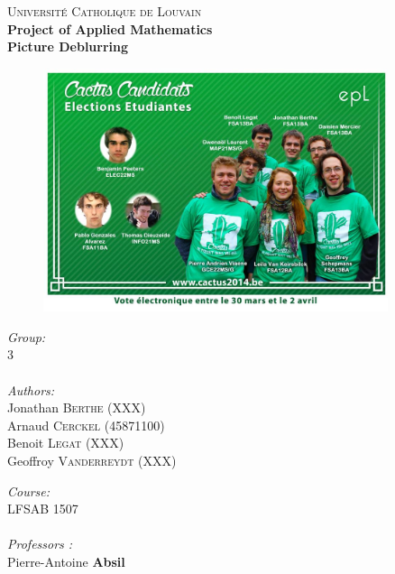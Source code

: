 \begin{titlepage}
\begin{center}
\textsc{\Large Université Catholique de Louvain}\\[0.5cm]
{\Large \bfseries Project of Applied Mathematics}\\
{\huge \bfseries Picture Deblurring
}\\
\end{center}
\vfill
\begin{figure}[h!]
\includegraphics[width=0.9\textwidth]{Couverture/Couverture.jpg}
\centering
\end{figure}
\vfill
\begin{minipage}{0.5\textwidth}
\begin{flushleft} \large
\emph{Group:} \\
3\\
~\\
\emph{Authors:}\\
Jonathan \textsc{Berthe} (XXX)\\
Arnaud \textsc{Cerckel} (45871100)\\
Benoit \textsc{Legat} (XXX)\\
Geoffroy \textsc{Vanderreydt} (XXX)\\
\end{flushleft}
\end{minipage}
\begin{minipage}{0.5\textwidth}
\begin{flushright} \large
\emph{Course:} \\
LFSAB 1507\\
~\\
\emph{Professors :} \\
Pierre-Antoine \textbf{Absil}\\

\end{flushright}
\end{minipage}
\end{titlepage}
